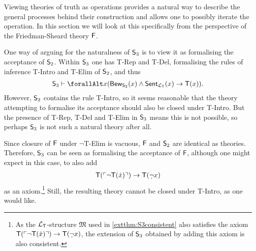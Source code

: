 \documentclass[UKenglish,cleveref,DIV=12]{scrartcl}
\let\forall\forallAlt
\theoremstyle{definition}
\theoremstyle{definition}
\begin{document}
Viewing theories of truth as operations provides a natural way to describe the
general processes behind their construction and allows one to possibly iterate
the operation. In this section we will look at this specifically from the
perspective of the Friedman-Sheard theory $\mathsf{F}$.%

One way of arguing for the naturalness of $\mathsf{S}_3$ is to view it as formalising the acceptance of $\mathsf{S}_2$. Within $\mathsf{S}_3$ one has T-Rep and T-Del, formalising the rules of inference T-Intro and T-Elim of $\mathsf{S}_2$, and thus
\begin{align*}
  \theory S_3\proves
  \forall x( \Prov_{\theory S_2}(x)\land\Sent_{\L_\T}(x)\rightarrow \T(x)).
\end{align*}
However, $\mathsf{S}_2$ contains the rule T-Intro, so it seems reasonable that the theory attempting to formalise its acceptance should also be closed under T-Intro. But the presence of T-Rep, T-Del and T-Elim in $\mathsf{S}_3$ means this is not possible, so perhaps $\mathsf{S}_3$ is not such a natural theory after all.

Since closure of $\mathsf{F}$ under $\lnot$T-Elim is vacuous, $\mathsf{F}$ and $\mathsf{S}_2$ are identical as theories. Therefore, $\mathsf{S}_3$ can be seen as formalising the acceptance of $\mathsf{F}$, although one might expect in this case, to also add
\begin{align*}%
  \T(\gn{\lnot \T(\dot x)})\rightarrow \T(\dlnot x)
\end{align*}
as an axiom.\footnote{As the $\mathcal{L}_{\mathsf{T}}$-structure $\mathfrak{M}$ used in \cref{extthm:S3consistent} also satisfies the axiom $\T(\gn{\lnot \T(\dot x)})\rightarrow \T(\dlnot x)$, the extension of $\mathsf{S}_3$ obtained by adding this axiom is also consistent.} Still, the resulting theory cannot be closed under T-Intro, as one would like.
\end{document}
